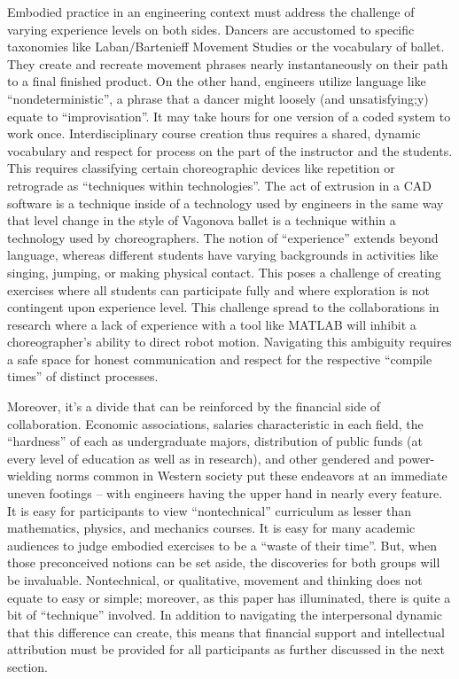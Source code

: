 \documentclass[arts,article,submit,moreauthors,pdftex,10pt,a4paper]{mdpi}
\begin{document}
Embodied practice in an engineering context must address the challenge of varying experience levels on both sides.  Dancers are accustomed to specific taxonomies like Laban/Bartenieff Movement Studies or the vocabulary of ballet.  They create and recreate movement phrases nearly instantaneously on their path to a final finished product.  On the other hand, engineers utilize language like ``nondeterministic'', a phrase that a dancer might loosely (and unsatisfying;y) equate to ``improvisation''.  It may take hours for one version of a coded system to work once.   Interdisciplinary course creation thus requires a shared, dynamic  vocabulary and respect for process on the part of the instructor and the students.  This requires classifying certain choreographic devices like repetition or retrograde as ``techniques within technologies''.  The act of extrusion in a CAD software is a technique inside of a technology used by engineers in the same way that level change in the style of Vagonova ballet is a technique within a technology used by choreographers.  The notion of ``experience'' extends beyond language, whereas different students have varying backgrounds in activities like singing, jumping, or making physical contact.  This poses a challenge of creating exercises where all students can participate fully and where exploration is not contingent upon experience level.  This challenge spread to the collaborations in research where a lack of experience with a tool like MATLAB will inhibit a choreographer's ability to direct robot motion.  Navigating this ambiguity requires a safe space for honest communication and respect for the respective ``compile times'' of distinct processes.

Moreover, it's a divide that can be reinforced by the financial side of collaboration.  Economic associations, salaries characteristic in each field, the ``hardness'' of each as undergraduate majors, distribution of public funds (at every level of education as well as in research), and other gendered and power-wielding norms common in Western society put these endeavors at an immediate uneven footings -- with engineers having the upper hand in nearly every feature.  It is easy for participants to view ``nontechnical'' curriculum as lesser than mathematics, physics, and mechanics courses.  It is easy for many academic audiences to judge embodied exercises to be a ``waste of their time''.  But, when those preconceived notions can be set aside, the discoveries for both groups will be invaluable.  Nontechnical, or qualitative, movement and thinking does not equate to easy or simple; moreover, as this paper has illuminated, there is quite a bit of ``technique'' involved.  In addition to navigating the interpersonal dynamic that this difference can create, this means that financial support and intellectual attribution must be provided for all participants as further discussed in the next section.
\end{document}
